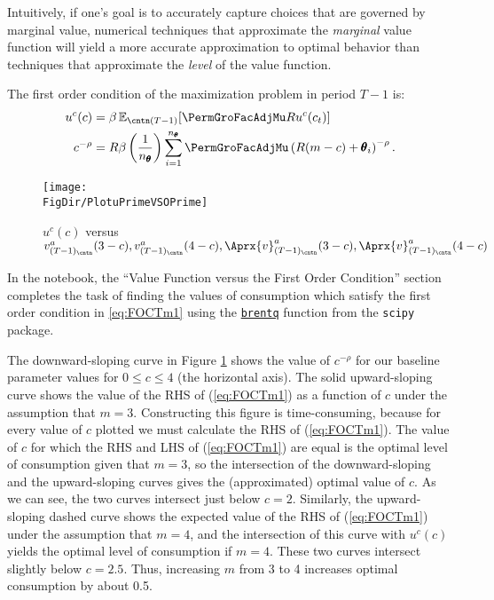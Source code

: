 \documentclass[titlepage, headings=optiontotocandhead]{Resources/texmf-local/tex/latex/econtex}
\begin{document}
Intuitively, if one's goal is to accurately capture choices
that are governed by marginal value,
numerical techniques that approximate the \textit{marginal} value
function will yield a more accurate approximation to
optimal behavior than techniques that approximate the \textit{level}
of the value function.

The first order condition of the maximization problem in period $T-1$ is:
  \begin{equation}\begin{gathered}\begin{aligned}
        u^{c}(c)       & = \beta \Ex_{\cntn(T-1)} [\PermGroFacAdjMu R u^{c}(c_{t})]  %
        \\      c^{-\rho}   & = R \beta \left(\frac{1}{n_{\TranShkEmp}}\right) \sum_{i=1}^{n_{\TranShkEmp}} \PermGroFacAdjMu\left(R (m-c) + \TranShkEmp_{i}\right)^{-\rho} \label{eq:FOCTm1}.
      \end{aligned}\end{gathered}\end{equation}
\hypertarget{PlotuPrimeVSOPrime}{}
\begin{figure}
  \centerline{\texttt{[image: \\FigDir/PlotuPrimeVSOPrime]}}
  \caption{$u^{c}(c)$ versus $v_{({T-1})_\cntn}^{a}(3-c), v_{({T-1})_\cntn}^{a}(4-c), \Aprx{v}_{({T-1})_\cntn}^{a}(3-c), \Aprx{v}_{({T-1})_\cntn}^{a}(4-c)$}
  \label{fig:PlotuPrimeVSOPrime}
\end{figure}

In the notebook, the ``Value Function versus the First Order Condition'' section completes the task of finding the values of consumption which satisfy the first order condition in \eqref{eq:FOCTm1} using the \href{https://docs.scipy.org/doc/scipy/reference/generated/scipy.optimize.brentq.html}{\texttt{brentq}} function from the \texttt{scipy} package.%


The downward-sloping curve in Figure \ref{fig:PlotuPrimeVSOPrime}
shows the value of $c^{-\rho}$ for our baseline parameter values
for $0 \leq c \leq 4$ (the horizontal axis).  The solid
upward-sloping curve shows the value of the RHS of (\ref{eq:FOCTm1})
as a function of $c$ under the assumption that $m=3$.
Constructing this figure is time-consuming, because for every
value of $c$ plotted we must calculate the RHS of
(\ref{eq:FOCTm1}).  The value of $c$ for which the RHS and LHS
of (\ref{eq:FOCTm1}) are equal is the optimal level of consumption
given that $m=3$, so the intersection of the downward-sloping
and the upward-sloping curves gives the (approximated) optimal value of $c$.
As we can see, the two curves intersect just below $c=2$.
Similarly, the upward-sloping dashed curve shows the expected value
of the RHS of (\ref{eq:FOCTm1}) under the assumption that $m=4$,
and the intersection of this curve with $u^{c}(c)$ yields the
optimal level of consumption if $m=4$.  These two curves
intersect slightly below $c=2.5$.  Thus, increasing $m$
from 3 to 4 increases optimal consumption by about 0.5.
\end{document}
